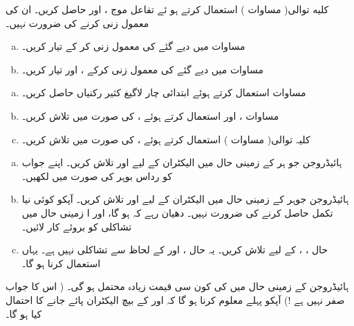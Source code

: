 کلیه توالی( مساوات ) استعمال کرتے ہو ئے تفاعل موج ،  اور  حاصل کریں۔ ان کی معمول زنی کرنے کی ضرورت نہیں۔ 
\begin{enumerate}[a.]
\item
مساوات  میں دیے گئے  کی معمول زنی کر کے  تیار کریں۔
\item
مساوات  میں دیے گئے  کی معمول زنی کرکے ،  اور  تیار کریں۔ 
\end{enumerate}
\begin{enumerate}[a.]
\item
مساوات  استعمال کرتے ہوئے ابتدائی چار لاگیغ کثیر رکنیاں حاصل کریں۔
\item
مساوات ،  اور  استعمال کرتے ہوئے ،  کی صورت میں  تلاش کریں۔
\item
کلیہ توالی( مساوات ) استعمال کرتے ہوئے ،  کی صورت میں  تلاش کریں۔ 
\end{enumerate}
\begin{enumerate}[a.]
\item
ہائیڈروجن جو ہر کے زمینی حال میں الیکٹران کے لیے  اور  تلاش کریں۔ اپنے جواب کو رداس بوہر کی صورت میں لکھیں۔ 
\item
ہائیڈروجن جوہر کے زمینی حال میں الیکٹران کے لیے  اور  تلاش کریں۔  آپکو کوئی نیا تکمل حاصل کرنے کی ضرورت نہیں۔ دھیان رہے کہ 
  ہو گا، اور ا زمینی حال میں تشاکلی کو بروئے کار لائیں۔ 
\item
حال ، ،  کے لیے  تلاش کریں۔  یہ حال ،  اور  کے لحاظ سے تشاکلی نہیں ہے۔ یہاں
 استعمال کرنا ہو گا۔ 
\end{enumerate}
ہائیڈروجن کے زمینی حال میں  کی کون سی قیمت زیادہ محتمل ہو گی۔ ( اس کا جواب صفر نہیں ہے !)  آپکو پہلے معلوم کرنا ہو گا کہ  اور  کے بیچ الیکٹران پائے جانے کا احتمال کیا ہو گا۔
